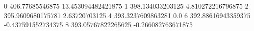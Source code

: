 0 406.77685546875 13.453094482421875
1 398.134033203125 4.810272216796875
2 395.9609680175781 2.63720703125
4 393.3237609863281 0.0
6 392.88616943359375 -0.437591552734375
8 393.05767822265625 -0.266082763671875
